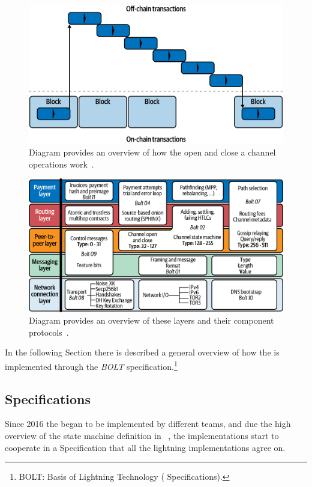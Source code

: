\begin{figure}[h]
  \begin{center}
  \includegraphics[width=0.6\columnwidth]{imgs/mtln_0702.png}
  \end{center}
    \caption{Diagram provides an overview of how the open and close a channel operations work~\cite{lnbook}.}
  \label{fig:ln-onchain}
\end{figure}


\begin{figure}[h]
  \begin{center}
  \includegraphics[width=0.6\columnwidth]{imgs/mtln_0601.png}
  \end{center}
    \caption{Diagram provides an overview of these layers and their component protocols~\cite{lnbook}.}
  \label{fig:lightning-stack}
\end{figure}

In the following Section there is described a general overview of how the {\LN} is implemented through the
\emph{BOLT} specification.\footnote{BOLT: Basis of Lightning Technology ({\LN} Specifications).}

\subsection{{\LN} Specifications}

Since 2016 the {\LN} began to be implemented by different teams,
and due the high overview of the {\LN} state machine definition in ~\cite{lightning-network-paper},
the implementations start to cooperate in a Specification that all the lightning implementations agree on.

